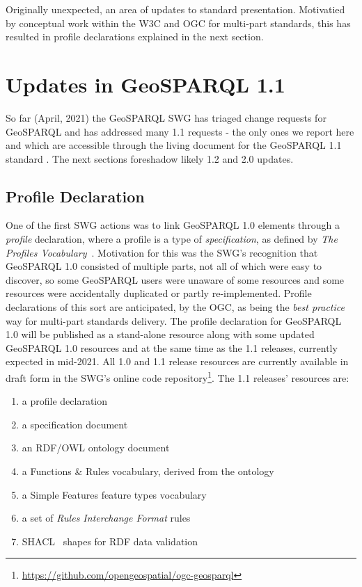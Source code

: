 \documentclass[runningheads]{llncs}
\begin{document}
Originally unexpected, an area of updates to standard presentation. Motivatied by conceptual work within the W3C and OGC for  
multi-part standards, this has resulted in profile declarations explained in the next section.


\section{Updates in GeoSPARQL 1.1}\label{sec:newfeatures}
So far (April, 2021) the GeoSPARQL SWG has triaged change requests for GeoSPARQL and has addressed
many 1.1 requests - the only ones we report here and which are accessible through the living document for the GeoSPARQL 1.1 standard \cite{ogcgeosparql11}. The next sections foreshadow likely 1.2 and 2.0 updates.

\subsection{Profile Declaration}\label{sec:profiledec}
One of the first SWG actions was to link GeoSPARQL 1.0 elements through a \textit{profile} 
declaration, where a profile is a type of \textit{specification}, as defined by \textit{The Profiles Vocabulary}~\cite{atkinson_profiles_2020}. 
Motivation for this was the SWG's recognition that GeoSPARQL 1.0 consisted of multiple parts, not all
of which were easy to discover, so some GeoSPARQL users were unaware of some resources and some
resources were accidentally duplicated or partly re-implemented. Profile declarations of this sort are anticipated, by the OGC, 
as being the \textit{best practice} way for multi-part standards delivery.
The profile declaration for GeoSPARQL 1.0 will be published as a stand-alone resource along with some 
updated GeoSPARQL 1.0 resources and at the same time as the 
1.1 releases, currently expected in mid-2021. All 1.0 and 1.1 release resources are currently available in draft form 
in the SWG's online code repository\footnote{\url{https://github.com/opengeospatial/ogc-geosparql}}. The 1.1 releases' resources are:

\begin{enumerate}
    \item a profile declaration
    \item a specification document
    \item an RDF/OWL ontology document
    \item a Functions \& Rules vocabulary, derived from the ontology
    \item a Simple Features feature types vocabulary
    \item a set of \textit{Rules Interchange Format} rules
    \item SHACL~\cite{knublauch_shapes_2017} shapes for RDF data validation 
\end{enumerate}
\end{document}
